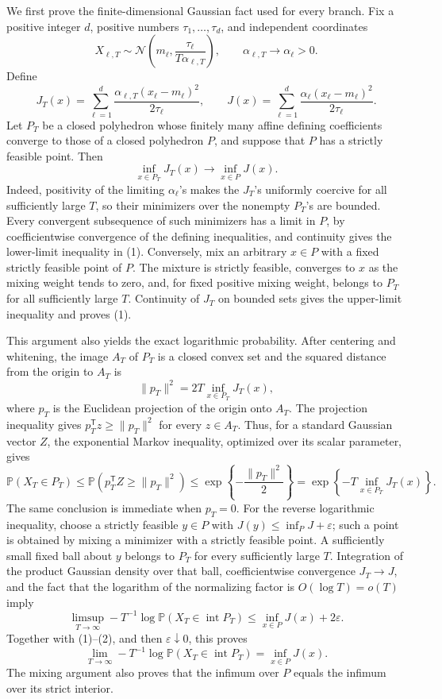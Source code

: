 We first prove the finite-dimensional Gaussian fact used for every branch. Fix a positive integer \(d\), positive numbers \(\tau_1,\ldots,\tau_d\), and independent coordinates
\[
 X_{\ell,T}\sim\mathcal N\!\left(m_\ell,\frac{\tau_\ell}{T\alpha_{\ell,T}}\right),
 \qquad \alpha_{\ell,T}\longrightarrow\alpha_\ell>0.
\]
Define
\[
 J_T(x)=\sum_{\ell=1}^d\frac{\alpha_{\ell,T}(x_\ell-m_\ell)^2}{2\tau_\ell},
 \qquad
 J(x)=\sum_{\ell=1}^d\frac{\alpha_\ell(x_\ell-m_\ell)^2}{2\tau_\ell}.
\]
Let \(P_T\) be a closed polyhedron whose finitely many affine defining coefficients converge to those of a closed polyhedron \(P\), and suppose that \(P\) has a strictly feasible point. Then
\[
 \inf_{x\in P_T}J_T(x)\longrightarrow\inf_{x\in P}J(x). \tag{1}
\]
Indeed, positivity of the limiting \(\alpha_\ell\)'s makes the \(J_T\)'s uniformly coercive for all sufficiently large \(T\), so their minimizers over the nonempty \(P_T\)'s are bounded. Every convergent subsequence of such minimizers has a limit in \(P\), by coefficientwise convergence of the defining inequalities, and continuity gives the lower-limit inequality in (1). Conversely, mix an arbitrary \(x\in P\) with a fixed strictly feasible point of \(P\). The mixture is strictly feasible, converges to \(x\) as the mixing weight tends to zero, and, for fixed positive mixing weight, belongs to \(P_T\) for all sufficiently large \(T\). Continuity of \(J_T\) on bounded sets gives the upper-limit inequality and proves (1).

This argument also yields the exact logarithmic probability. After centering and whitening, the image \(A_T\) of \(P_T\) is a closed convex set and the squared distance from the origin to \(A_T\) is
\[
 \lVert p_T\rVert^2=2T\inf_{x\in P_T}J_T(x),
\]
where \(p_T\) is the Euclidean projection of the origin onto \(A_T\). The projection inequality gives \(p_T^{\mathsf T}z\geq\lVert p_T\rVert^2\) for every \(z\in A_T\). Thus, for a standard Gaussian vector \(Z\), the exponential Markov inequality, optimized over its scalar parameter, gives
\[
 \mathbb P(X_T\in P_T)
 \leq\mathbb P\!\left(p_T^{\mathsf T}Z\geq\lVert p_T\rVert^2\right)
 \leq \exp\!\left\{-\frac{\lVert p_T\rVert^2}{2}\right\}
 =\exp\!\left\{-T\inf_{x\in P_T}J_T(x)\right\}. \tag{2}
\]
The same conclusion is immediate when \(p_T=0\). For the reverse logarithmic inequality, choose a strictly feasible \(y\in P\) with \(J(y)\leq\inf_PJ+\varepsilon\); such a point is obtained by mixing a minimizer with a strictly feasible point. A sufficiently small fixed ball about \(y\) belongs to \(P_T\) for every sufficiently large \(T\). Integration of the product Gaussian density over that ball, coefficientwise convergence \(J_T\to J\), and the fact that the logarithm of the normalizing factor is \(O(\log T)=o(T)\) imply
\[
 \limsup_{T\to\infty}-T^{-1}\log
 \mathbb P(X_T\in\operatorname{int}P_T)
 \leq \inf_{x\in P}J(x)+2\varepsilon.
\]
Together with (1)--(2), and then \(\varepsilon\downarrow0\), this proves
\[
 \lim_{T\to\infty}-T^{-1}\log
 \mathbb P(X_T\in\operatorname{int}P_T)
 =\inf_{x\in P}J(x). \tag{3}
\]
The mixing argument also proves that the infimum over \(P\) equals the infimum over its strict interior.

